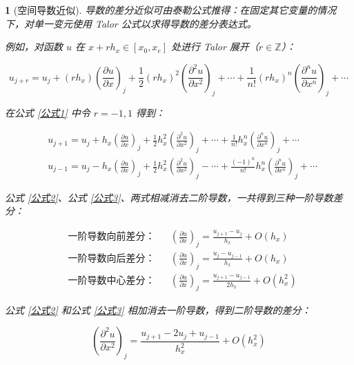 \documentclass[zihao=5,UTF8]{report}
\def\Z{\mathbb{Z}}
\theoremstyle{MyTheoremStyle} %
\theoremstyle{MySubsubsectionStyle} %
\newtheorem{definition}{}
\begin{document}
\begin{definition}[空间导数近似]
导数的差分近似可由泰勒公式推得：在固定其它变量的情况下，对单一变元使用 Talor 公式以求得导数的差分表达式。

例如，对函数 $u$ 在 $x+rh_x \in [x_0,x_e]$ 处进行 Talor 展开（$r \in \Z $）：

\begin{equation}\label{公式1}
    u_{j+r}=u_j+(rh_x)\left(\frac{\partial u}{\partial x}\right)_j+\frac{1}{2}(rh_x)^2\left(\frac{\partial^2u}{\partial x^2}\right)_j+\cdots+\frac{1}{n!}(rh_x)^n\left(\frac{\partial^nu}{\partial x^n}\right)_j+\cdots 
\end{equation}

在公式 \ref{公式1} 中令 $r = -1,1$ 得到：

\begin{align}
    &u_{j+1}=u_{j}+h_x\left(\frac{\partial u}{\partial x}\right)_{j}+\frac{1}{2}h_x^{2}\left(\frac{\partial^{2}u}{\partial x^{2}}\right)_{j}+\cdots+\frac{1}{n!}h_x^{n}\left(\frac{\partial^{n}u}{\partial x^{n}}\right)_{j}+\cdots \label{公式2}  \\ 
    &u_{j-1}=u_j-h_x\left(\frac{\partial u}{\partial x}\right)_j+\frac{1}{2}h_x^2\left(\frac{\partial^2u}{\partial x^2}\right)_j-\cdots+\frac{(-1)^n}{n!}h_x^n\left(\frac{\partial^nu}{\partial x^n}\right)_j+\cdots \label{公式3}
\end{align}

公式 \ref{公式2}、公式 \ref{公式3}、两式相减消去二阶导数，一共得到三种一阶导数差分：

\begin{equation}
\begin{aligned}
    &\text{一阶导数向前差分：}&& \left(\frac{\partial u }{\partial x }\right)_{j} = \frac{u_{j+1}-u_j}{h_x}  + O(h_x)\\ 
    &\text{一阶导数向后差分：}&& \left(\frac{\partial u }{\partial x }\right)_{j} = \frac{u_{j}-u_{j-1}}{h_x}  + O(h_x)\\ 
    &\text{一阶导数中心差分：}&& \left(\frac{\partial u }{\partial x }\right)_{j} = \frac{u_{j+1}-u_{j-1}}{2h_x}  + O(h_x^2)
\end{aligned}
\end{equation}

公式 \ref{公式2} 和公式 \ref{公式3} 相加消去一阶导数，得到二阶导数的差分：

\begin{equation}
    \left(\frac{\partial^2u}{\partial x^2}\right)_j=\frac{u_{j+1}-2u_j+u_{j-1}}{h_x^2}+O(h_x^2)
\end{equation}

\end{definition}
\end{document}
